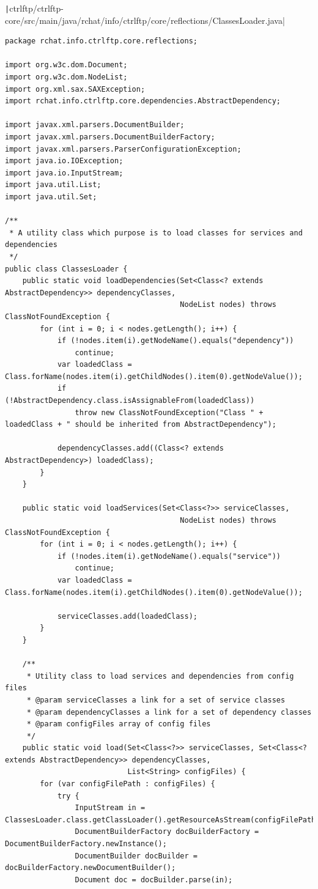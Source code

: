 \documentclass[a4paper,14pt]{extarticle}
\begin{document}
\texttt|ctrlftp/ctrlftp-core/src/main/java/rchat/info/ctrlftp/core/reflections/ClassesLoader.java|
\begin{verbatim}
package rchat.info.ctrlftp.core.reflections;

import org.w3c.dom.Document;
import org.w3c.dom.NodeList;
import org.xml.sax.SAXException;
import rchat.info.ctrlftp.core.dependencies.AbstractDependency;

import javax.xml.parsers.DocumentBuilder;
import javax.xml.parsers.DocumentBuilderFactory;
import javax.xml.parsers.ParserConfigurationException;
import java.io.IOException;
import java.io.InputStream;
import java.util.List;
import java.util.Set;

/**
 * A utility class which purpose is to load classes for services and dependencies
 */
public class ClassesLoader {
    public static void loadDependencies(Set<Class<? extends AbstractDependency>> dependencyClasses,
                                        NodeList nodes) throws ClassNotFoundException {
        for (int i = 0; i < nodes.getLength(); i++) {
            if (!nodes.item(i).getNodeName().equals("dependency"))
                continue;
            var loadedClass = Class.forName(nodes.item(i).getChildNodes().item(0).getNodeValue());
            if (!AbstractDependency.class.isAssignableFrom(loadedClass))
                throw new ClassNotFoundException("Class " + loadedClass + " should be inherited from AbstractDependency");

            dependencyClasses.add((Class<? extends AbstractDependency>) loadedClass);
        }
    }

    public static void loadServices(Set<Class<?>> serviceClasses,
                                        NodeList nodes) throws ClassNotFoundException {
        for (int i = 0; i < nodes.getLength(); i++) {
            if (!nodes.item(i).getNodeName().equals("service"))
                continue;
            var loadedClass = Class.forName(nodes.item(i).getChildNodes().item(0).getNodeValue());

            serviceClasses.add(loadedClass);
        }
    }

    /**
     * Utility class to load services and dependencies from config files
     * @param serviceClasses a link for a set of service classes
     * @param dependencyClasses a link for a set of dependency classes
     * @param configFiles array of config files
     */
    public static void load(Set<Class<?>> serviceClasses, Set<Class<? extends AbstractDependency>> dependencyClasses,
                            List<String> configFiles) {
        for (var configFilePath : configFiles) {
            try {
                InputStream in = ClassesLoader.class.getClassLoader().getResourceAsStream(configFilePath);
                DocumentBuilderFactory docBuilderFactory = DocumentBuilderFactory.newInstance();
                DocumentBuilder docBuilder = docBuilderFactory.newDocumentBuilder();
                Document doc = docBuilder.parse(in);


\end{verbatim}
\end{document}

